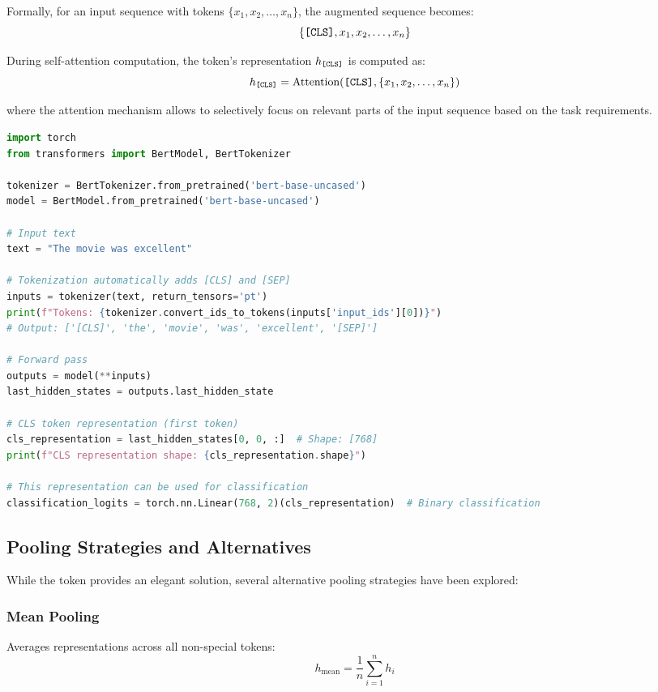 Formally, for an input sequence with tokens $\{x_1, x_2, \ldots, x_n\}$, the augmented sequence becomes:
$$\{\texttt{[CLS]}{}, x_1, x_2, \ldots, x_n\}$$

During self-attention computation, the \cls{} token's representation $h_{\texttt{[CLS]}{}}$ is computed as:
$$h_{\texttt{[CLS]}{}} = \text{Attention}(\texttt{[CLS]}{}, \{x_1, x_2, \ldots, x_n\})$$

where the attention mechanism allows \cls{} to selectively focus on relevant parts of the input sequence based on the task requirements.

\begin{lstlisting}[language=Python, caption=CLS Token Processing]
import torch
from transformers import BertModel, BertTokenizer

tokenizer = BertTokenizer.from_pretrained('bert-base-uncased')
model = BertModel.from_pretrained('bert-base-uncased')

# Input text
text = "The movie was excellent"

# Tokenization automatically adds [CLS] and [SEP]
inputs = tokenizer(text, return_tensors='pt')
print(f"Tokens: {tokenizer.convert_ids_to_tokens(inputs['input_ids'][0])}")
# Output: ['[CLS]', 'the', 'movie', 'was', 'excellent', '[SEP]']

# Forward pass
outputs = model(**inputs)
last_hidden_states = outputs.last_hidden_state

# CLS token representation (first token)
cls_representation = last_hidden_states[0, 0, :]  # Shape: [768]
print(f"CLS representation shape: {cls_representation.shape}")

# This representation can be used for classification
classification_logits = torch.nn.Linear(768, 2)(cls_representation)  # Binary classification
\end{lstlisting}

\subsection{Pooling Strategies and Alternatives}

While the \cls{} token provides an elegant solution, several alternative pooling strategies have been explored:

\subsubsection{Mean Pooling}
Averages representations across all non-special tokens:
$$h_{\text{mean}} = \frac{1}{n} \sum_{i=1}^{n} h_i$$

